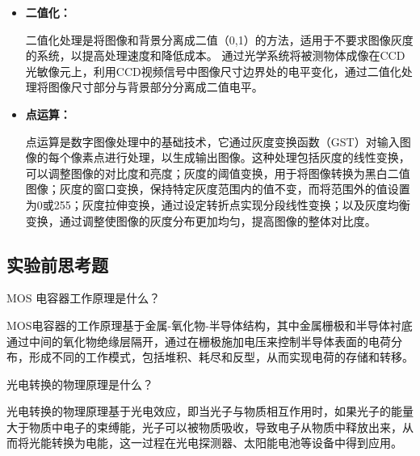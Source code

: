 \documentclass[dvipsnames, svgnames,a4paper,11pt]{article}
\begin{document}
		\begin{itemize}
			\item \textbf{二值化：}
			
				二值化处理是将图像和背景分离成二值（0,1）的方法，适用于不要求图像灰度的系统，以提高处理速度和降低成本。
				通过光学系统将被测物体成像在CCD光敏像元上，利用CCD视频信号中图像尺寸边界处的电平变化，通过二值化处理将图像尺寸部分与背景部分分离成二值电平。


			\item \textbf{点运算：}
			
				点运算是数字图像处理中的基础技术，它通过灰度变换函数（GST）对输入图像的每个像素点进行处理，以生成输出图像。这种处理包括灰度的线性变换，可以调整图像的对比度和亮度；灰度的阈值变换，用于将图像转换为黑白二值图像；灰度的窗口变换，保持特定灰度范围内的值不变，而将范围外的值设置为0或255；灰度拉伸变换，通过设定转折点实现分段线性变换；以及灰度均衡变换，通过调整使图像的灰度分布更加均匀，提高图像的整体对比度。
		\end{itemize}
	




\subsection{实验前思考题}

\begin{question}
	MOS 电容器工作原理是什么？
\end{question}

	MOS电容器的工作原理基于金属-氧化物-半导体结构，其中金属栅极和半导体衬底通过中间的氧化物绝缘层隔开，通过在栅极施加电压来控制半导体表面的电荷分布，形成不同的工作模式，包括堆积、耗尽和反型，从而实现电荷的存储和转移。

	





\begin{question}
	光电转换的物理原理是什么？
\end{question}

	光电转换的物理原理基于光电效应，即当光子与物质相互作用时，如果光子的能量大于物质中电子的束缚能，光子可以被物质吸收，导致电子从物质中释放出来，从而将光能转换为电能，这一过程在光电探测器、太阳能电池等设备中得到应用。
\end{document}
